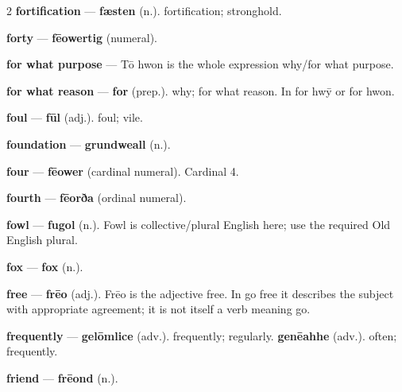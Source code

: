 \begin{multicols}{2}
\textbf{fortification} — \textbf{fæsten} (n.). fortification; stronghold.\par
\textbf{forty} — \textbf{fēowertig} (numeral).\par
\textbf{for what purpose} — Tō hwon is the whole expression why/for what purpose.\par
\textbf{for what reason} — \textbf{for} (prep.). why; for what reason. In for hwȳ or for hwon.\par
\textbf{foul} — \textbf{fūl} (adj.). foul; vile.\par
\textbf{foundation} — \textbf{grundweall} (n.).\par
\textbf{four} — \textbf{fēower} (cardinal numeral). Cardinal 4.\par
\textbf{fourth} — \textbf{fēorða} (ordinal numeral).\par
\textbf{fowl} — \textbf{fugol} (n.). Fowl is collective/plural English here; use the required Old English plural.\par
\textbf{fox} — \textbf{fox} (n.).\par
\textbf{free} — \textbf{frēo} (adj.).  Frēo is the adjective free. In go free it describes the subject with appropriate agreement; it is not itself a verb meaning go.\par
\textbf{frequently} — \textbf{gelōmlice} (adv.). frequently; regularly. \textbf{genēahhe} (adv.). often; frequently.\par
\textbf{friend} — \textbf{frēond} (n.).\par

\end{multicols}
